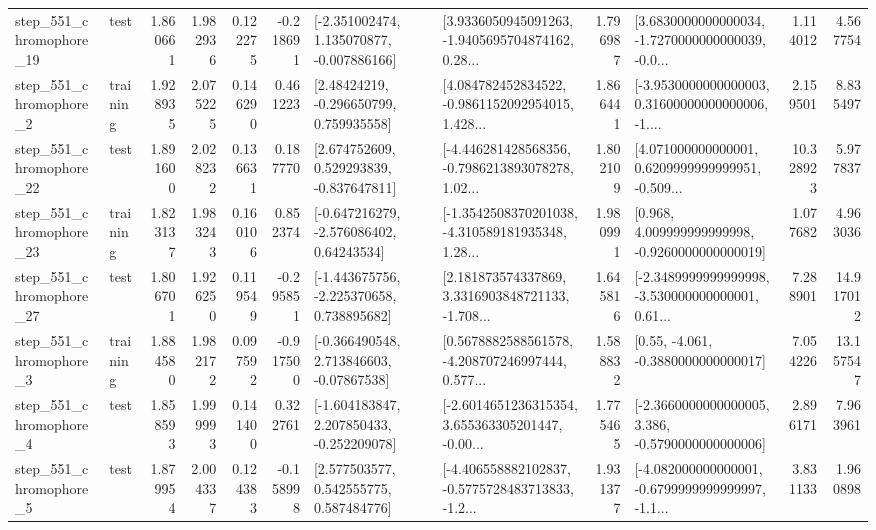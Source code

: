 \begin{tabular}{llrrrrllrlrr}
  step\_551\_chromophore\_19 &      test &      1.860661 &    1.982936 &      0.122275 & -0.218691 &   [-2.351002474, 1.135070877, -0.007886166] &  [3.9336050945091263, -1.9405695704874162, 0.28... &       1.796987 &  [3.6830000000000034, -1.7270000000000039, -0.0... &            1.114012 &          4.567754 \\
   step\_551\_chromophore\_2 &  training &      1.928935 &    2.075225 &      0.146290 &  0.461223 &     [2.48424219, -0.296650799, 0.759935558] &  [4.084782452834522, -0.9861152092954015, 1.428... &       1.866441 &  [-3.9530000000000003, 0.31600000000000006, -1.... &            2.159501 &          8.835497 \\
  step\_551\_chromophore\_22 &      test &      1.891600 &    2.028232 &      0.136631 &  0.187770 &    [2.674752609, 0.529293839, -0.837647811] &  [-4.446281428568356, -0.7986213893078278, 1.02... &       1.802109 &  [4.071000000000001, 0.6209999999999951, -0.509... &           10.328923 &          5.977837 \\
  step\_551\_chromophore\_23 &  training &      1.823137 &    1.983243 &      0.160106 &  0.852374 &    [-0.647216279, -2.576086402, 0.64243534] &  [-1.3542508370201038, -4.310589181935348, 1.28... &       1.980991 &    [0.968, 4.009999999999998, -0.9260000000000019] &            1.077682 &          4.963036 \\
  step\_551\_chromophore\_27 &      test &      1.806701 &    1.926250 &      0.119549 & -0.295851 &   [-1.443675756, -2.225370658, 0.738895682] &  [2.181873574337869, 3.3316903848721133, -1.708... &       1.645816 &  [-2.3489999999999998, -3.530000000000001, 0.61... &            7.288901 &         14.917012 \\
   step\_551\_chromophore\_3 &  training &      1.884580 &    1.982172 &      0.097592 & -0.917500 &    [-0.366490548, 2.713846603, -0.07867538] &  [0.5678882588561578, -4.208707246997444, 0.577... &       1.588832 &                [0.55, -4.061, -0.3880000000000017] &            7.054226 &         13.157547 \\
   step\_551\_chromophore\_4 &      test &      1.858593 &    1.999993 &      0.141400 &  0.322761 &   [-1.604183847, 2.207850433, -0.252209078] &  [-2.6014651236315354, 3.655363305201447, -0.00... &       1.775465 &  [-2.3660000000000005, 3.386, -0.5790000000000006] &            2.896171 &          7.963961 \\
   step\_551\_chromophore\_5 &      test &      1.879954 &    2.004337 &      0.124383 & -0.158998 &     [2.577503577, 0.542555775, 0.587484776] &  [-4.406558882102837, -0.5775728483713833, -1.2... &       1.931377 &  [-4.082000000000001, -0.6799999999999997, -1.1... &            3.831133 &          1.960898 \\

\end{tabular}
